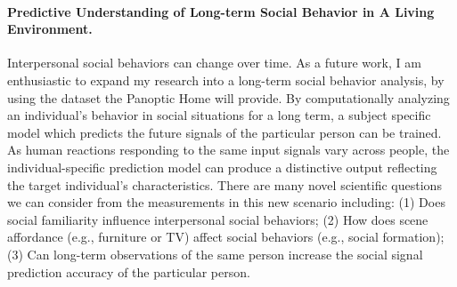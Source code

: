 \paragraph{Predictive Understanding of Long-term Social Behavior in A Living Environment.}
Interpersonal social behaviors can change over time. As a future work, I am enthusiastic to expand my research into a long-term social behavior analysis, by using the dataset the Panoptic Home will provide. By computationally analyzing an individual's behavior in social situations for a long term, a subject specific model which predicts the future signals of the particular person can be trained. As human reactions responding to the same input signals vary across people, the individual-specific prediction model can produce a distinctive output reflecting the target individual's characteristics. There are many novel scientific questions we can consider from the measurements in this new scenario including: (1) Does social familiarity influence interpersonal social behaviors; (2) How does scene affordance (e.g., furniture or TV) affect social behaviors (e.g., social formation); (3) Can long-term observations of the same person increase the social signal prediction accuracy of the particular person. 
